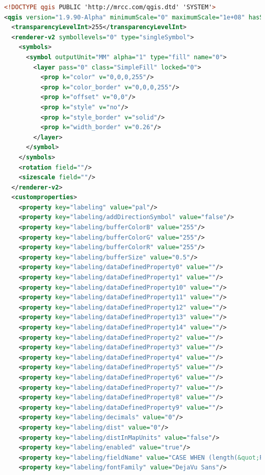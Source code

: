 \documentclass[a4paper,12pt,oneside]{book}
\begin{document}
\begin{lstlisting}[language=XML]
<!DOCTYPE qgis PUBLIC 'http://mrcc.com/qgis.dtd' 'SYSTEM'>
<qgis version="1.9.90-Alpha" minimumScale="0" maximumScale="1e+08" hasScaleBasedVisibilityFlag="0">
  <transparencyLevelInt>255</transparencyLevelInt>
  <renderer-v2 symbollevels="0" type="singleSymbol">
    <symbols>
      <symbol outputUnit="MM" alpha="1" type="fill" name="0">
        <layer pass="0" class="SimpleFill" locked="0">
          <prop k="color" v="0,0,0,255"/>
          <prop k="color_border" v="0,0,0,255"/>
          <prop k="offset" v="0,0"/>
          <prop k="style" v="no"/>
          <prop k="style_border" v="solid"/>
          <prop k="width_border" v="0.26"/>
        </layer>
      </symbol>
    </symbols>
    <rotation field=""/>
    <sizescale field=""/>
  </renderer-v2>
  <customproperties>
    <property key="labeling" value="pal"/>
    <property key="labeling/addDirectionSymbol" value="false"/>
    <property key="labeling/bufferColorB" value="255"/>
    <property key="labeling/bufferColorG" value="255"/>
    <property key="labeling/bufferColorR" value="255"/>
    <property key="labeling/bufferSize" value="0.5"/>
    <property key="labeling/dataDefinedProperty0" value=""/>
    <property key="labeling/dataDefinedProperty1" value=""/>
    <property key="labeling/dataDefinedProperty10" value=""/>
    <property key="labeling/dataDefinedProperty11" value=""/>
    <property key="labeling/dataDefinedProperty12" value=""/>
    <property key="labeling/dataDefinedProperty13" value=""/>
    <property key="labeling/dataDefinedProperty14" value=""/>
    <property key="labeling/dataDefinedProperty2" value=""/>
    <property key="labeling/dataDefinedProperty3" value=""/>
    <property key="labeling/dataDefinedProperty4" value=""/>
    <property key="labeling/dataDefinedProperty5" value=""/>
    <property key="labeling/dataDefinedProperty6" value=""/>
    <property key="labeling/dataDefinedProperty7" value=""/>
    <property key="labeling/dataDefinedProperty8" value=""/>
    <property key="labeling/dataDefinedProperty9" value=""/>
    <property key="labeling/decimals" value="0"/>
    <property key="labeling/dist" value="0"/>
    <property key="labeling/distInMapUnits" value="false"/>
    <property key="labeling/enabled" value="true"/>
    <property key="labeling/fieldName" value="CASE WHEN (length(&quot;PODDELENI_CISLA_PAR&quot; ) = 0  OR &quot;PODDELENI_CISLA_PAR&quot; = '0') THEN  KMENOVE_CISLO_PAR ELSE &quot;KMENOVE_CISLO_PAR&quot;  || '/' || &quot;PODDELENI_CISLA_PAR&quot; END"/>
    <property key="labeling/fontFamily" value="DejaVu Sans"/>

\end{lstlisting}
\end{document}
